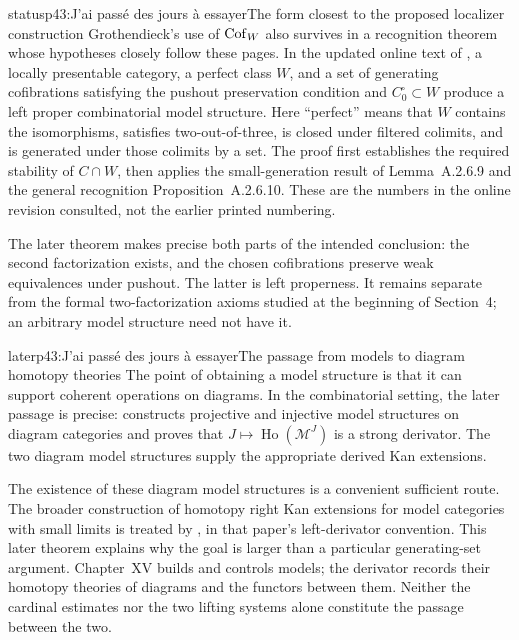 \begin{dcomment}{status}{p43:J'ai passé des jours à essayer}{The form closest to the proposed localizer construction}
Grothendieck's use of $\mathrm{Cof}_W$ also survives in a recognition theorem whose hypotheses closely follow these pages. In the updated online text of \citet[Proposition~A.2.6.15]{Lurie2009HTT}, a locally presentable category, a perfect class $W$, and a set of generating cofibrations satisfying the pushout preservation condition and $C_0^{\square}\subset W$ produce a left proper combinatorial model structure. Here ``perfect'' means that $W$ contains the isomorphisms, satisfies two-out-of-three, is closed under filtered colimits, and is generated under those colimits by a set. The proof first establishes the required stability of $C\cap W$, then applies the small-generation result of Lemma~A.2.6.9 and the general recognition Proposition~A.2.6.10. These are the numbers in the online revision consulted, not the earlier printed numbering.

The later theorem makes precise both parts of the intended conclusion: the second factorization exists, and the chosen cofibrations preserve weak equivalences under pushout. The latter is left properness. It remains separate from the formal two-factorization axioms studied at the beginning of Section~4; an arbitrary model structure need not have it.
\end{dcomment}


\begin{dcomment}{later}{p43:J'ai passé des jours à essayer}{The passage from models to diagram homotopy theories}
The point of obtaining a model structure is that it can support coherent operations on diagrams. In the combinatorial setting, the later passage is precise: \citet[Theorem~1.28 and Proposition~1.30]{Groth2013} constructs projective and injective model structures on diagram categories and proves that $J\mapsto\operatorname{Ho}(\mathcal M^J)$ is a strong derivator. The two diagram model structures supply the appropriate derived Kan extensions.

The existence of these diagram model structures is a convenient sufficient route. The broader construction of homotopy right Kan extensions for model categories with small limits is treated by \citet[Theorem~6.11]{Cisinski2003}, in that paper's left-derivator convention. This later theorem explains why the goal is larger than a particular generating-set argument. Chapter~XV builds and controls models; the derivator records their homotopy theories of diagrams and the functors between them. Neither the cardinal estimates nor the two lifting systems alone constitute the passage between the two.
\end{dcomment}


